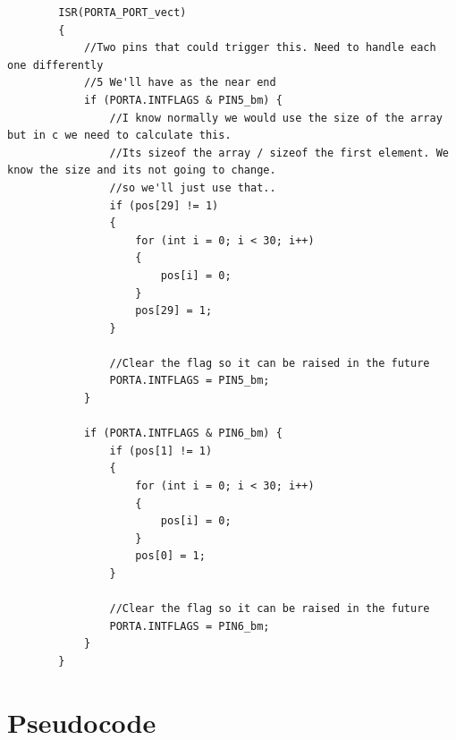 \documentclass[11pt,a4paper,titlepage]{report}
\begin{document}
\begin{lstlisting}
		ISR(PORTA_PORT_vect)
		{
			//Two pins that could trigger this. Need to handle each one differently
			//5 We'll have as the near end
			if (PORTA.INTFLAGS & PIN5_bm) {
				//I know normally we would use the size of the array but in c we need to calculate this. 
				//Its sizeof the array / sizeof the first element. We know the size and its not going to change. 
				//so we'll just use that..
				if (pos[29] != 1) 
				{
					for (int i = 0; i < 30; i++)
					{
						pos[i] = 0;
					}
					pos[29] = 1;
				}
				
				//Clear the flag so it can be raised in the future
				PORTA.INTFLAGS = PIN5_bm;
			}
			
			if (PORTA.INTFLAGS & PIN6_bm) {
				if (pos[1] != 1)
				{
					for (int i = 0; i < 30; i++)
					{
						pos[i] = 0;
					}
					pos[0] = 1;
				}
				
				//Clear the flag so it can be raised in the future
				PORTA.INTFLAGS = PIN6_bm;
			}
		}
	\end{lstlisting}
	
	\chapter{Pseudocode}\label{appendix:psuedocode}
	
\end{document}
